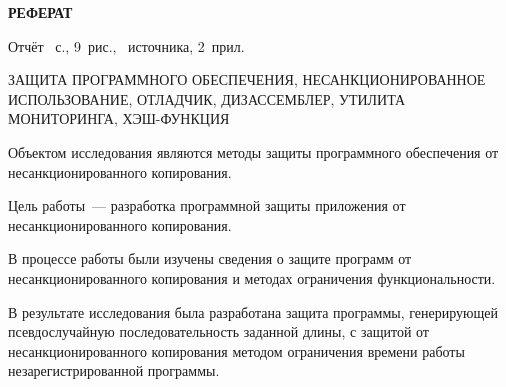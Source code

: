 \begin{center}
  \Large{\textbf{РЕФЕРАТ}}
\end{center}

Отчёт ~с., 9~рис., ~источника,
2~прил.

ЗАЩИТА ПРОГРАММНОГО ОБЕСПЕЧЕНИЯ, НЕСАНКЦИОНИРОВАННОЕ ИСПОЛЬЗОВАНИЕ,
ОТЛАДЧИК, ДИЗ\-АС\-СЕМБ\-ЛЕР, УТИЛИТА МОНИТОРИНГА, ХЭШ-ФУНКЦИЯ

Объектом исследования являются методы защиты программного обеспечения
от несанкционированного копирования.

Цель работы~--- разработка программной защиты приложения от
несанкционированного копирования.

В процессе работы были изучены сведения о защите программ от
несанкционированного копирования и методах ограничения
функциональности.

В результате исследования была разработана защита программы,
генерирующей псевдослучайную последовательность заданной длины, с
защитой от несанкционированного копирования методом ограничения
времени работы незарегистрированной программы. \newpage

